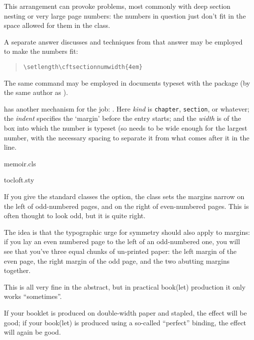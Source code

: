 This arrangement can provoke problems, most commonly with deep section
nesting or very large page numbers: the numbers in question just don't
fit in the space allowed for them in the class.

A separate answer discusses %
\nothtml{ ---}
and techniques from that answer may be employed to make the numbers
fit:
\begin{quote}
\begin{verbatim}
\setlength\cftsectionnumwidth{4em}
\end{verbatim}
\end{quote}

The same command may be employed in documents typeset with the
 package (by the same author as ).

 has another mechanism for the job:
.  Here
\emph{kind} is \texttt{chapter}, \texttt{section}, or whatever; the
\emph{indent} specifies the `margin' before the entry starts; and the
\emph{width} is of the box into which the number is typeset (so needs
to be wide enough for the largest number, with the necessary spacing
to separate it from what comes after it in the line.
\begin{ctanrefs}
\item[memoir.cls]
\item[tocloft.sty]
\end{ctanrefs}


If you give the standard classes the  option, the
class sets the margins narrow on the left of odd-numbered pages, and
on the right of even-numbered pages.  This is often thought to look
odd, but it is quite right.

The idea is that the typographic urge for symmetry should also apply
to margins: if you lay an even numbered page to the left of an
odd-numbered one, you will see that you've three equal chunks of
un-printed paper: the left margin of the even page, the right margin
of the odd page, and the two abutting margins together.

This is all very fine in the abstract, but in practical book(let)
production it only works ``sometimes''.

If your booklet is produced on double-width paper and stapled, the
effect will be good; if your book(let) is produced using a so-called
``perfect'' binding, the effect will again be good.

